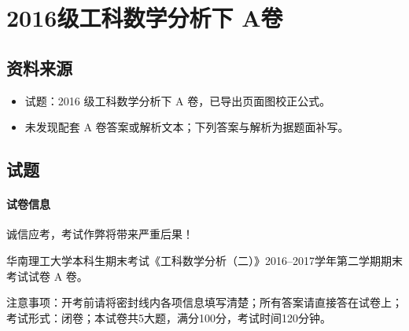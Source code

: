 \section{2016级工科数学分析下 A卷}

\subsection{资料来源}
\begin{itemize}
  \item 试题：2016 级工科数学分析下 A 卷，已导出页面图校正公式。
  \item 未发现配套 A 卷答案或解析文本；下列答案与解析为据题面补写。
\end{itemize}

\subsection{试题}

\paragraph*{试卷信息}
诚信应考，考试作弊将带来严重后果！

华南理工大学本科生期末考试《工科数学分析（二）》2016--2017学年第二学期期末考试试卷 A 卷。

注意事项：开考前请将密封线内各项信息填写清楚；所有答案请直接答在试卷上；考试形式：闭卷；本试卷共5大题，满分100分，考试时间120分钟。

